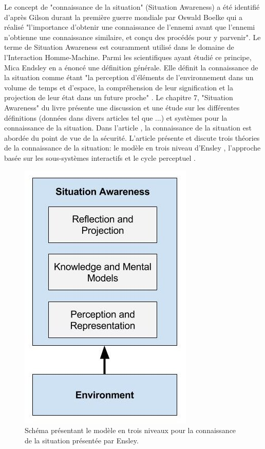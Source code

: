 \documentclass[a4paper,11pt,twoside]{StyleThese}
\begin{document}
Le concept de "connaissance de la situation" (Situation Awareness) a été identifié d'après Gilson \cite{gilson1995} durant la première guerre mondiale par Oswald Boelke qui a réalisé "l'importance d'obtenir une connaissance de l'ennemi avant que l'ennemi n'obtienne une connaissance similaire, et conçu des procédés pour y parvenir". Le terme de Situation Awareness est couramment utilisé dans le domaine de l'Interaction Homme-Machine. Parmi les scientifiques ayant étudié ce principe, Mica Endsley en a énoncé une définition générale. Elle définit la connaissance de la situation comme étant "la perception d'éléments de l'environnement dans un volume de temps et d'espace, la compréhension de leur signification et la projection de leur état dans un future proche" \cite{endsley2000}.
Le chapitre 7, "Situation Awareness" du livre \cite{pew1998modeling} présente une discussion et une étude sur les différentes définitions (données dans divers articles tel que \cite{stiffler1988graduate,noble1989application,fracker1988theory}...) et systèmes pour la connaissance de la situation. Dans l'article \cite{stanton2001situational}, la connaissance de la situation est abordée du point de vue de la sécurité. L'article présente et discute trois théories de la connaissance de la situation: le modèle en trois niveau d'Ensley \cite{endsley1995}, l'approche basée sur les sous-systèmes interactifs \cite{bedny1999theory} et le cycle perceptuel  \cite{smith1995situation}.

\begin{figure}[ht!]
 \centering
  \includegraphics[width=0.49\linewidth]{./img/ensley.jpg} 
  \caption {Schéma présentant le modèle en trois niveaux pour la connaissance de la situation présentée par Ensley.}
  \label{fig:ensley}
\end{figure}
\end{document}
